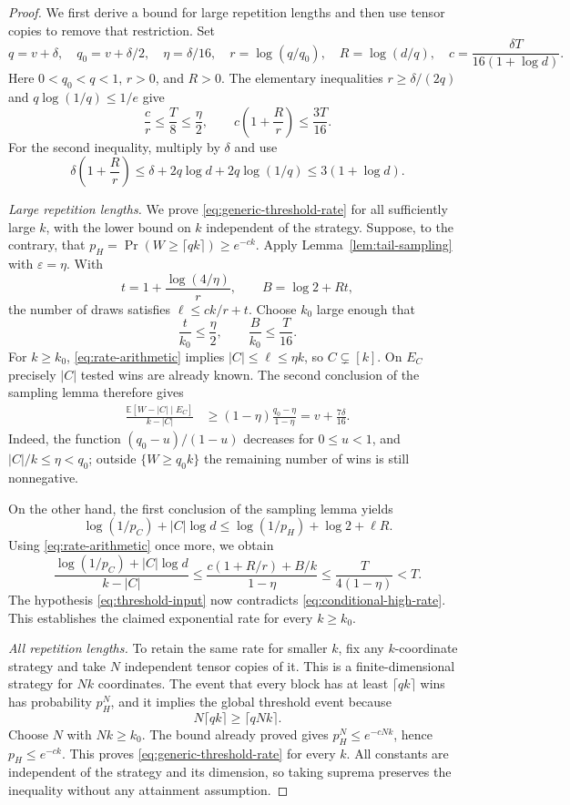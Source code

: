 \begin{proof}
We first derive a bound for large repetition lengths and then use tensor
copies to remove that restriction. Set
\[
 q=v+\delta,\quad q_0=v+\delta/2,\quad
 \eta=\delta/16,\quad r=\log(q/q_0),\quad R=\log(d/q),
 \quad c=\frac{\delta T}{16(1+\log d)}.
\]
Here $0<q_0<q<1$, $r>0$, and $R>0$. The elementary inequalities
$r\ge\delta/(2q)$ and $q\log(1/q)\le1/e$ give
\begin{equation}\label{eq:rate-arithmetic}
 \frac c r\le\frac{T}{8}\le\frac{\eta}{2},
 \qquad
 c\left(1+\frac Rr\right)\le\frac{3T}{16}.
\end{equation}
For the second inequality, multiply by $\delta$ and use
\[
 \delta\left(1+\frac Rr\right)
 \le\delta+2q\log d+2q\log(1/q)
 \le3(1+\log d).
\]

\emph{Large repetition lengths.}
We prove \eqref{eq:generic-threshold-rate} for all sufficiently large $k$,
with the lower bound on $k$ independent of the strategy.
Suppose, to the contrary, that
$p_H=\Pr(W\ge\lceil qk\rceil)\ge e^{-ck}$. Apply
Lemma~\ref{lem:tail-sampling} with $\varepsilon=\eta$.
With
\[
 t=1+\frac{\log(4/\eta)}r,
 \qquad B=\log2+Rt,
\]
the number of draws satisfies $\ell\le ck/r+t$. Choose $k_0$ large
enough that
\[
 \frac{t}{k_0}\le\frac\eta2,
 \qquad \frac{B}{k_0}\le\frac T{16}.
\]
For $k\ge k_0$, \eqref{eq:rate-arithmetic} implies $|C|\le\ell\le\eta k$,
so $C\subsetneq[k]$. On $E_C$ precisely $|C|$ tested wins are already
known. The second conclusion of the sampling lemma therefore gives
\begin{align}
 \frac{\mathbb E[W-|C|\mid E_C]}{k-|C|}
 &\ge (1-\eta)\frac{q_0-\eta}{1-\eta}
   =v+\frac{7\delta}{16}.
 \label{eq:conditional-high-rate}
\end{align}
Indeed, the function $(q_0-u)/(1-u)$ decreases for $0\le u<1$, and
$|C|/k\le\eta<q_0$; outside $\{W\ge q_0k\}$ the remaining number of
wins is still nonnegative.

On the other hand, the first conclusion of the sampling lemma yields
\[
 \log(1/p_C)+|C|\log d
 \le \log(1/p_H)+\log2+\ell R.
\]
Using \eqref{eq:rate-arithmetic} once more, we obtain
\[
 \frac{\log(1/p_C)+|C|\log d}{k-|C|}
 \le
 \frac{c(1+R/r)+B/k}{1-\eta}
 \le\frac{T}{4(1-\eta)}<T.
\]
The hypothesis \eqref{eq:threshold-input} now contradicts
\eqref{eq:conditional-high-rate}. This establishes the claimed
exponential rate for every $k\ge k_0$.

\emph{All repetition lengths.}
To retain the same rate for smaller $k$, fix any $k$-coordinate strategy
and take $N$ independent tensor copies of it. This is a finite-dimensional
strategy for $Nk$ coordinates. The event that every block has at least
$\lceil qk\rceil$ wins has probability $p_H^N$, and it implies the global
threshold event because
\[
 N\lceil qk\rceil\ge\lceil qNk\rceil.
\]
Choose $N$ with $Nk\ge k_0$. The bound already proved gives
$p_H^N\le e^{-cNk}$, hence $p_H\le e^{-ck}$. This proves
\eqref{eq:generic-threshold-rate} for every $k$. All constants are
independent of the strategy and its dimension, so taking suprema
preserves the inequality without any attainment assumption.
\end{proof}


